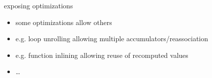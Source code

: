 \begin{frame}{exposing optimizations}
    \begin{itemize}
    \item some optimizations allow others
    \item e.g. loop unrolling allowing multiple accumulators/reassociation
    \item e.g. function inlining allowing reuse of recomputed values
    \item \ldots
    \end{itemize}
\end{frame}
